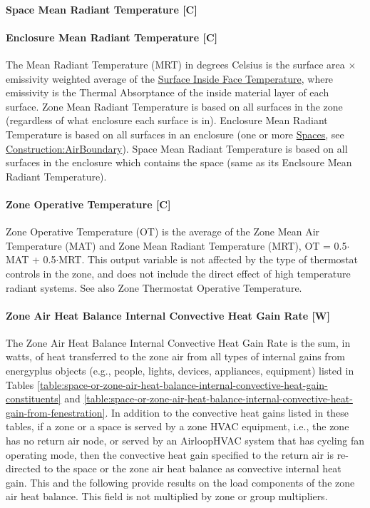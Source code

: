 \paragraph{Space Mean Radiant Temperature {[}C{]}}\label{space-mean-radiant-temperature-c}
\paragraph{Enclosure Mean Radiant Temperature {[}C{]}}\label{enclosure-mean-radiant-temperature-c}

The Mean Radiant Temperature (MRT) in degrees Celsius is the surface area $\times$ emissivity weighted average of the \hyperref[surface-inside-face-temperature-c]{Surface Inside Face Temperature}, where emissivity is the Thermal Absorptance of the inside material layer of each surface. Zone Mean Radiant Temperature is based on all surfaces in the zone (regardless of what enclosure each surface is in). Enclosure Mean Radiant Temperature is based on all surfaces in an enclosure (one or more \hyperref[space]{Spaces}, see \hyperref[constructionairboundary]{Construction:AirBoundary}). Space Mean Radiant Temperature is based on all surfaces in the enclosure which contains the space (same as its Enclsoure Mean Radiant Temperature).

\paragraph{Zone Operative Temperature {[}C{]}}\label{zone-operative-temperature-c}

Zone Operative Temperature (OT) is the average of the Zone Mean Air Temperature (MAT) and Zone Mean Radiant Temperature (MRT), OT = 0.5$\cdot$MAT + 0.5$\cdot$MRT. This output variable is not affected by the type of thermostat controls in the zone, and does not include the direct effect of high temperature radiant systems. See also Zone Thermostat Operative Temperature.

\paragraph{Zone Air Heat Balance Internal Convective Heat Gain Rate {[}W{]}}\label{zone-air-heat-balance-internal-convective-heat-gain-rate-w}

The Zone Air Heat Balance Internal Convective Heat Gain Rate is the sum, in watts, of heat transferred to the zone air from all types of internal gains from energyplus objects (e.g., people, lights, devices, appliances, equipment) listed in Tables \ref{table:space-or-zone-air-heat-balance-internal-convective-heat-gain-constituents} and \ref{table:space-or-zone-air-heat-balance-internal-convective-heat-gain-from-fenestration}. In addition to the convective heat gains listed in these tables, if a zone or a space is served by a zone HVAC equipment, i.e., the zone has no return air node, or served by an AirloopHVAC system that has cycling fan operating mode, then the convective heat gain specified to the return air is re-directed to the space or the zone air heat balance as convective internal heat gain. This and the following provide results on the load components of the zone air heat balance. This field is not multiplied by zone or group multipliers.

